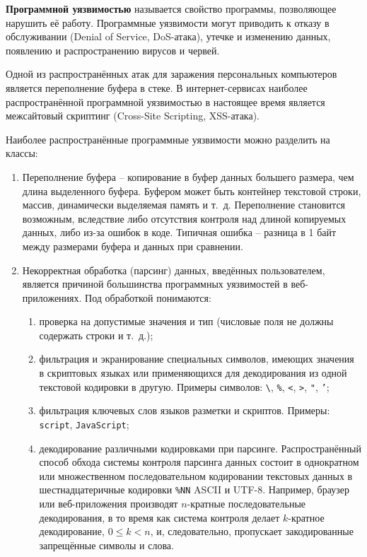 \documentclass[10pt,a4paper,openany]{book}
\begin{document}
\textbf{Программной уязвимостью} называется свойство программы, позволяющее нарушить её работу. Программные уязвимости могут приводить к отказу в обслуживании (Denial of Service, DoS-атака), утечке и изменению данных, появлению и распространению вирусов и червей.

Одной из распространённых атак для заражения персональных компьютеров является переполнение буфера в стеке. В интернет-сервисах наиболее распространённой программной уязвимостью в настоящее время является межсайтовый скриптинг (Cross-Site Scripting, XSS-атака).

Наиболее распространённые программные уязвимости можно разделить на классы:
\begin{enumerate}
    \item Переполнение буфера -- копирование в буфер данных большего размера, чем длина выделенного буфера. Буфером может быть контейнер текстовой строки, массив, динамически выделяемая память и т.~д. Переполнение становится возможным, вследствие либо отсутствия контроля над длиной копируемых данных, либо из-за ошибок в коде. Типичная ошибка -- разница в 1 байт между размерами буфера и данных при сравнении.
    \item Некорректная обработка (парсинг) данных, введённых пользователем, является причиной большинства программных уязвимостей в веб-приложениях. Под обработкой понимаются:
        \begin{enumerate}
            \item проверка на допустимые значения и тип (числовые поля не должны содержать строки и т.~д.);
            \item фильтрация и экранирование специальных символов, имеющих значения в скриптовых языках или применяющихся для декодирования из одной текстовой кодировки в другую. Примеры символов: \texttt{\textbackslash}, \texttt{\%}, \texttt{<}, \texttt{>}, \texttt{"}, \texttt{'};
            \item фильтрация ключевых слов языков разметки и скриптов. Примеры: \texttt{script}, \texttt{JavaScript};
            \item декодирование различными кодировками при парсинге. Распространённый способ обхода системы контроля парсинга данных состоит в однократном или множественном последовательном кодировании текстовых данных в шестнадцатеричные кодировки \texttt{\%NN} ASCII и UTF-8. Например, браузер или веб-приложения производят $n$-кратные последовательные декодирования, в то время как система контроля делает $k$-кратное декодирование, $0 \leq k < n$, и, следовательно, пропускает закодированные запрещённые символы и слова.

\end{enumerate}
\end{enumerate}
\end{document}
